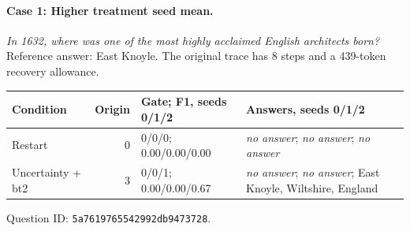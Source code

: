 \par\medskip\noindent\begin{minipage}{\linewidth}
\paragraph{Case 1: Higher treatment seed mean.}
\textit{In 1632, where was one of the most highly acclaimed English architects born?} Reference answer: East Knoyle. The original trace has 8 steps and a 439-token recovery allowance.
\begin{center}\footnotesize
\begin{tabular}{@{}p{.20\linewidth}rp{.16\linewidth}p{.44\linewidth}@{}}
\toprule Condition & Origin & Gate; F1, seeds 0/1/2 & Answers, seeds 0/1/2 \\
\midrule
Restart & 0 & 0/0/0; 0.00/0.00/0.00 & \textit{no answer}; \textit{no answer}; \textit{no answer} \\
Uncertainty + bt2 & 3 & 0/0/1; 0.00/0.00/0.67 & \textit{no answer}; \textit{no answer}; East Knoyle, Wiltshire, England \\
\bottomrule\end{tabular}\end{center}
Question ID: \texttt{5a7619765542992db9473728}.
\end{minipage}\par
